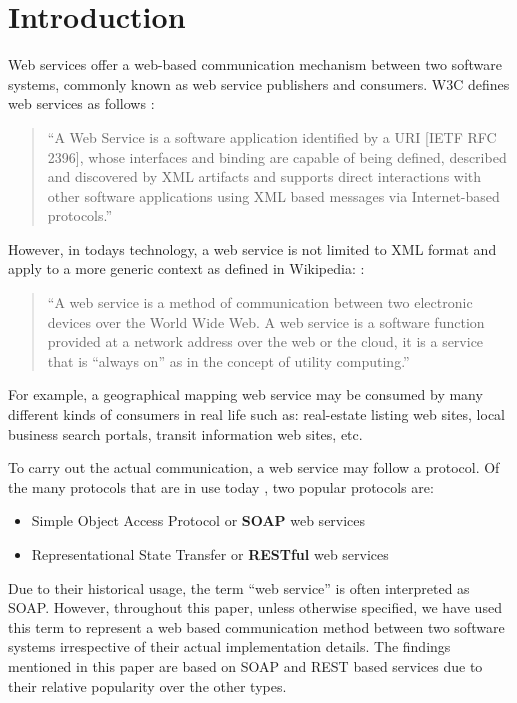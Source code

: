 \documentclass[runningheads,a4paper]{llncs}
\begin{document}
\section{Introduction}

Web services offer a web-based communication mechanism between two software systems, commonly known as web service publishers and consumers. W3C defines web services as follows \cite{w3c_web_service}:

\begin{quote}
``A Web Service is a software application identified by a URI [IETF RFC 2396], whose interfaces and binding are capable of being defined, described and discovered by XML artifacts and supports direct interactions with other software applications using XML based messages via Internet-based protocols.''
\end{quote}

However, in todays technology, a web service is not limited to XML format and apply to a more generic context as defined in Wikipedia: \cite{web_service_wiki}:

\begin{quote}
``A web service is a method of communication between two electronic devices over the World Wide Web. A web service is a software function provided at a network address over the web or the cloud, it is a service that is ``always on'' as in the concept of utility computing.''
\end{quote}

For example, a geographical mapping web service may be consumed by many different kinds of consumers in real life such as: real-estate listing web sites, local business search portals, transit information web sites, etc.

To carry out the actual communication, a web service may follow a protocol. Of the many protocols that are in use today \cite{web_service_protocols_wiki}, two popular protocols are:

\begin{itemize}
  \item Simple Object Access Protocol or \textbf{SOAP} web services
  \item Representational State Transfer or \textbf{RESTful} web services
\end{itemize}

Due to their historical usage, the term ``web service'' is often interpreted as SOAP. However, throughout this paper, unless otherwise specified, we have used this term to represent a web based communication method between two software systems irrespective of their actual implementation details. The findings mentioned in this paper are based on SOAP and REST based services due to their relative popularity over the other types.
\end{document}
